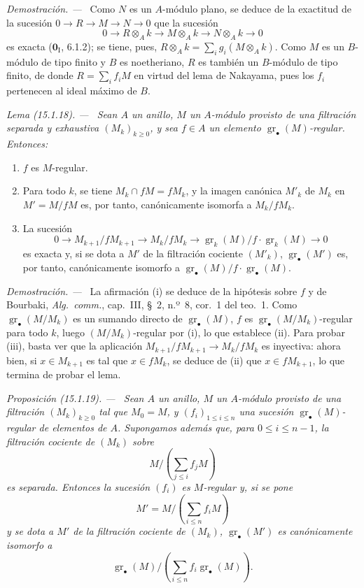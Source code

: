 \documentclass[10pt,oneside]{book}
\makeatletter
\newcommand{\gr}{\operatorname{gr}}
\newcommand{\setmanualcurrentlabel}[1]{\def\@currentlabel{#1}}
\newcommand{\oldpage}[2][]{%
  \setcounter{footnote}{0}%
  \marginpar{\scriptsize\textbf{#1}~|~#2}\ignorespaces}
\newenvironment{proposition}[1][]{%
  \setmanualcurrentlabel{#1}\par\medskip\noindent\itshape Proposición (#1). ---\ }{\par}
\newenvironment{lemma}[1][]{%
  \setmanualcurrentlabel{#1}\par\medskip\noindent\itshape Lema (#1). ---\ }{\par}
\newenvironment{proof}{%
  \par\medskip\noindent\textit{Demostración. ---\ }}{\par}
\makeatother
\begin{document}
\begin{proof}
\oldpage[0\textsubscript{IV-1}]{19}
Como $N$ es un $A$-módulo plano, se deduce de la exactitud de la sucesión
$0\to R\to M\to N\to0$ que la sucesión
\[
  0\longrightarrow R\otimes_A k\longrightarrow M\otimes_A k
  \longrightarrow N\otimes_A k\longrightarrow0
\]
es exacta ($\mathbf{0}_{\mathrm I}$, 6.1.2); se tiene, pues,
$R\otimes_A k=\sum_i g_i(M\otimes_A k)$. Como $M$ es un $B$-módulo de tipo
finito y $B$ es noetheriano, $R$ es también un $B$-módulo de tipo finito, de
donde $R=\sum_i f_iM$ en virtud del lema de Nakayama, pues los $f_i$ pertenecen
al ideal máximo de $B$.
\end{proof}

\begin{lemma}[15.1.18]
\label{0.15.1.18-es}
Sean $A$ un anillo, $M$ un $A$-módulo provisto de una filtración separada y
exhaustiva $(M_k)_{k\geq0}$, y sea $f\in A$ un elemento
$\gr_\bullet(M)$-regular. Entonces:
\begin{enumerate}
  \item[\textup{(i)}] $f$ es $M$-regular.
  \item[\textup{(ii)}] Para todo $k$, se tiene $M_k\cap fM=fM_k$, y la imagen canónica
  $M'_k$ de $M_k$ en $M'=M/fM$ es, por tanto, canónicamente isomorfa a
  $M_k/fM_k$.
  \item[\textup{(iii)}] La sucesión
  \[
    0\longrightarrow M_{k+1}/fM_{k+1}\longrightarrow M_k/fM_k
    \longrightarrow\gr_k(M)/f\cdot\gr_k(M)\longrightarrow0
  \]
  es exacta y, si se dota a $M'$ de la filtración cociente $(M'_k)$,
  $\gr_\bullet(M')$ es, por tanto, canónicamente isomorfo a
  $\gr_\bullet(M)/f\cdot\gr_\bullet(M)$.
\end{enumerate}
\end{lemma}

\begin{proof}
La afirmación (i) se deduce de la hipótesis sobre $f$ y de Bourbaki,
\emph{Alg.~comm.}, cap.~III, \S~2, n.º~8, cor.~1 del teo.~1. Como
$\gr_\bullet(M/M_k)$ es un sumando directo de $\gr_\bullet(M)$, $f$ es
$\gr_\bullet(M/M_k)$-regular para todo $k$, luego $(M/M_k)$-regular por (i),
lo que establece (ii). Para probar (iii), basta ver que la aplicación
$M_{k+1}/fM_{k+1}\to M_k/fM_k$ es inyectiva: ahora bien, si
$x\in M_{k+1}$ es tal que $x\in fM_k$, se deduce de (ii) que
$x\in fM_{k+1}$, lo que termina de probar el lema.
\end{proof}

\begin{proposition}[15.1.19]
\label{0.15.1.19-es}
Sean $A$ un anillo, $M$ un $A$-módulo provisto de una filtración
$(M_k)_{k\geq0}$ tal que $M_0=M$, y $(f_i)_{1\leq i\leq n}$ una sucesión
$\gr_\bullet(M)$-regular de elementos de $A$. Supongamos además que, para
$0\leq i\leq n-1$, la filtración cociente de $(M_k)$ sobre
\[
  M/\left(\sum_{j\leq i}f_jM\right)
\]
es separada. Entonces la sucesión $(f_i)$ es $M$-regular y, si se pone
\[
  M'=M/\left(\sum_{i\leq n}f_iM\right)
\]
y se dota a $M'$ de la filtración cociente de $(M_k)$,
$\gr_\bullet(M')$ es canónicamente isomorfo a
\[
  \gr_\bullet(M)/
  \left(\sum_{i\leq n}f_i\gr_\bullet(M)\right).
\]
\end{proposition}
\end{document}
